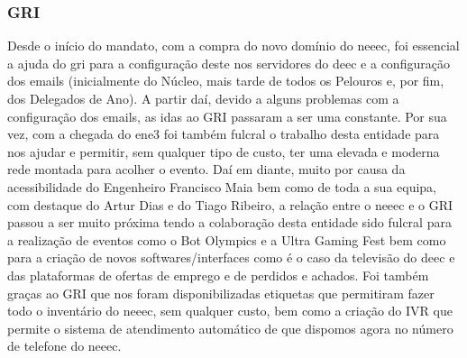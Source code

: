 
\subsubsection{GRI}

Desde o início do mandato, com a compra do novo domínio do \acrshort{neeec}, foi essencial a ajuda do \acrfull{gri} para a configuração deste nos servidores do \acrshort{deec} e a configuração dos emails (inicialmente do Núcleo, mais tarde de todos os Pelouros e, por fim, dos Delegados de Ano). A partir daí, devido a alguns problemas com a configuração dos emails, as idas ao GRI passaram a ser uma constante. Por sua vez, com a chegada do \acrshort{ene3} foi também fulcral o trabalho desta entidade para nos ajudar e permitir, sem qualquer tipo de custo, ter uma elevada e moderna rede montada para acolher o evento. Daí em diante, muito por causa da acessibilidade do Engenheiro Francisco Maia bem como de toda a sua equipa, com destaque do Artur Dias e do Tiago Ribeiro, a relação entre o \acrshort{neeec} e o GRI passou a ser muito próxima tendo a colaboração desta entidade sido fulcral para a realização de eventos como o Bot Olympics e a Ultra Gaming Fest bem como para a criação de novos softwares/interfaces como é o caso da televisão do \acrshort{deec} e das plataformas de ofertas de emprego e de perdidos e achados. Foi também graças ao GRI que nos foram disponibilizadas etiquetas que permitiram fazer todo o inventário do \acrshort{neeec}, sem qualquer custo, bem como a criação do IVR que permite o sistema de atendimento automático de que dispomos agora no número de telefone do \acrshort{neeec}.
